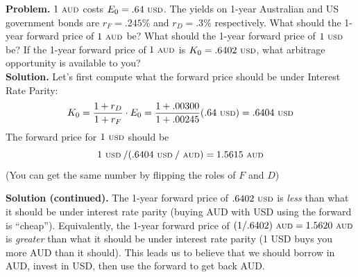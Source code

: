 \documentclass{beamer}
\begin{document}
\begin{frame}{}
	\textbf{Problem.} $1\text{ {\scriptsize AUD}}$ costs $E_{0}=.64\text{ {\scriptsize USD}}$. The yields on 1-year Australian and US government bonds are $r_{F}=.245\%$ and $r_{D}=.3\%$ respectively. What should the 1-year forward price of $1\text{ {\scriptsize AUD}}$ be? What should the 1-year forward price of $1\text{ {\scriptsize USD}}$ be? If the 1-year forward price of $1\text{ {\scriptsize AUD}}$ is $K_{0}=.6402\text{ {\scriptsize USD}}$, what arbitrage opportunity is available to you?\\ 
\vfill
	\textbf{Solution.} Let's first compute what the forward price should be under Interest Rate Parity:
	\begin{equation}
		K_{0}=\frac{1+r_{D}}{1+r_{F}}\cdot E_{0}=\frac{1+.00300}{1+.00245}(.64\text{ {\scriptsize USD}})=.6404\text{ {\scriptsize USD}}
	\end{equation}
	The forward price for $1\text{ {\scriptsize USD}}$ should be 
	\begin{equation}
		1\text{ {\scriptsize USD}}\:/(.6404\text{ {\scriptsize USD}}\:/\text{ {\scriptsize AUD}})=1.5615\text{ {\scriptsize AUD}}
	\end{equation} 
	(You can get the same number by flipping the roles of $F$ and $D$)
\end{frame}

\begin{frame}{}
	\textbf{Solution (continued).} The 1-year forward price of $.6402\text{ {\scriptsize USD}}$ is \textit{less} than what it should be under interest rate parity (buying AUD with USD using the forward is ``cheap''). Equivalently, the 1-year forward price of $(1/.6402)\text{ {\scriptsize AUD}}=1.5620\text{ {\scriptsize AUD}}$ is \textit{greater} than what it should be under interest rate parity (1 USD buys you more AUD than it should). This leads us to believe that we should borrow in AUD, invest in USD, then use the forward to get back AUD.
\end{frame}
\end{document}
